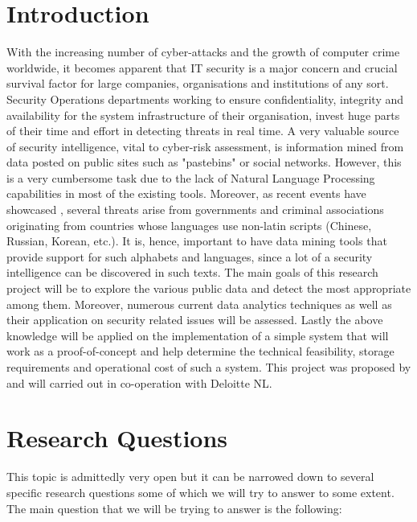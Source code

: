 \documentclass[12pt]{article}
\begin{document}
\tableofcontents

\newpage

\section*{Introduction}
\parbox{\linewidth}{
With the increasing number of cyber-attacks and the growth of computer crime worldwide, it becomes apparent that IT security is a major concern and crucial survival factor for large companies, organisations and institutions of any sort. Security Operations departments working to ensure confidentiality, integrity and availability for the system infrastructure of their organisation, invest huge \cite{cyber} parts of their time and effort in detecting threats in real time. A very valuable source of security intelligence, vital to cyber-risk assessment, is information mined from data posted on public sites such as "pastebins" or social networks. However, this is a very cumbersome task due to the lack of Natural Language Processing capabilities in most of the existing tools. Moreover, as recent events have showcased \cite{sony}, several threats arise from governments and criminal associations originating from countries whose languages use non-latin scripts (Chinese, Russian, Korean, etc.). It is, hence, important to have data mining tools that provide support for such alphabets and languages, since a lot of a security intelligence can be discovered in such texts. The main goals of this research project will be to explore the various public data and detect the most appropriate among them. Moreover, numerous current data analytics techniques as well as their application on security related issues will be assessed. Lastly the above knowledge will be applied on the implementation of a simple system that will work as a proof-of-concept and help determine the technical feasibility, storage requirements and operational cost of such a system. This project was proposed by and will carried out in co-operation with Deloitte NL. 
}
\newpage
\section{Research Questions}
This topic is admittedly very open but it can be narrowed down to several specific research questions some of which we will try to answer to some extent. The main question that we will be trying to answer is the following:\\[0.1cm]
\end{document}
